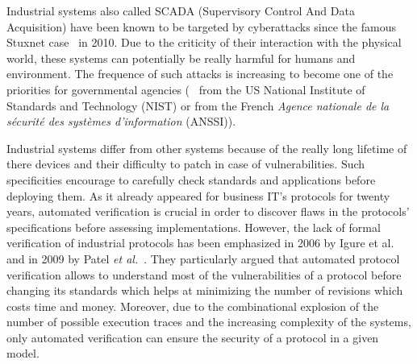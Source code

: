 Industrial systems also called SCADA (Supervisory Control And Data
Acquisition) have been known to be targeted by cyberattacks since the
famous Stuxnet case~\cite{Lan11} in 2010.  Due to the criticity of
their interaction with the physical world, these systems can
potentially be really harmful for humans and environment.  The
frequence of such attacks is increasing to become one of the priorities for
governmental agencies (\eg~\cite{SFS11} from the US National Institute of
Standards and Technology (NIST) or
\cite{ANSSI12_guide_securite_industrielle_en} from the French {\em Agence
nationale de la sécurité des systèmes d'information} (ANSSI)).


Industrial systems differ from other systems because of
the really long lifetime of there devices and their difficulty to
patch in case of vulnerabilities.
Such specificities encourage to carefully check
standards and applications before deploying them.
As it already appeared for business IT's protocols for twenty years,
automated verification is crucial in order to discover flaws in the
protocols' specifications before assessing implementations. However,
the lack of formal verification of industrial protocols has been
emphasized in 2006 by Igure et al.~\cite{ILW06} and in 2009 by
Patel \emph{et al.}~\cite{PBG09}.  They particularly argued that
automated protocol verification allows to understand most of the
vulnerabilities of a protocol before changing its standards which
helps at minimizing the number of revisions which costs time and
money.  Moreover, due to the combinational explosion of the number of
possible execution traces and the increasing complexity of the
systems, only automated verification can ensure the security of a
protocol in a given model.

